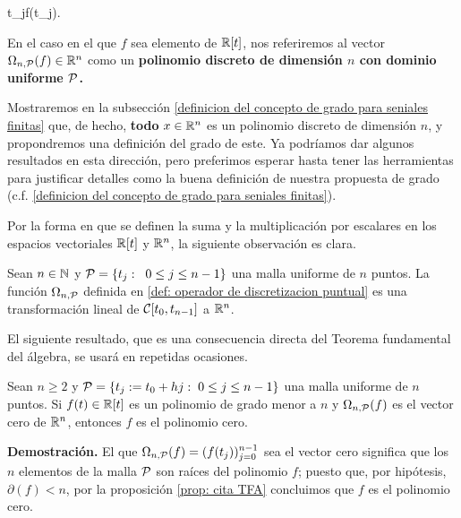 \begin{center}
{}
{\IR }
{t_{j}}{f(t_{j}).}
\end{center}



\begin{defi} \label{def: polinomio discreto}
En el caso en el que $f$ sea elemento de $\mathbb{R}[t]$, 
nos referiremos
al vector $\Omega_{n,\mathcal{P}}(f) \in \mathbb{R}^{n}$
como un \textbf{polinomio discreto de dimensión $n$ con dominio uniforme $\mathcal{P}$.} 
\end{defi} 



Mostraremos en la subsección
\ref{definicion del concepto de grado para seniales finitas}
que, de hecho, \textbf{todo}
$x \in \mathbb{R}^{n}$ es un polinomio discreto
de dimensión $n$,
y propondremos una definición del grado de este.
Ya podríamos dar algunos resultados en esta dirección,
pero preferimos esperar hasta tener las herramientas
para justificar detalles como la buena definición
de nuestra propuesta de grado (c.f. 
\ref{definicion del concepto de grado para seniales finitas}).


Por la forma en que se definen la suma y la multiplicación
por escalares en los espacios vectoriales $\mathbb{R}[t]$
y $\mathbb{R}^{n}$, la siguiente observación es clara.

\begin{obs} \label{obs:linealidad de omega restringida a R[x]}
Sean $n \in \mathbb{N}$ y $\mathcal{P}=\{t_{j}:
\hspace{0.2cm}0 \leq j \leq n-1 \}$ una malla uniforme
de $n$ puntos.
La función $\Omega_{n , \mathcal{P}}$ 
definida en 
\ref{def: operador de discretizacion puntual}
es una transformación lineal de 
$\mathcal{C}[t_{0}, t_{n-1}]$ a $\mathbb{R}^{n}$.
\end{obs}
 
El siguiente resultado, que es una consecuencia directa
del Teorema fundamental del álgebra, se usará en repetidas ocasiones.

\begin{prop}
\label{prop: consecuencia del TFA}
Sean $n \geq 2$ y 
$\mathcal{P}=\{ t_{j}:=t_{0}+hj : \hspace{0.1cm} 0 \leq j \leq n-1 \}$ 
una malla uniforme de $n$ puntos.
Si $f(t) \in \mathbb{R}[t]$ es un polinomio de grado menor a $n$ y
$\Omega_{n, \mathcal{P}}(f)$ es el vector cero de $\mathbb{R}^{n}$, entonces
$f$ es el polinomio cero.
\end{prop}
\noindent
\textbf{Demostración.}
El que $\Omega_{n, \mathcal{P}}(f)=(f(t_{j}))_{j=0}^{n-1}$ sea
el vector cero significa que los $n$ elementos de la malla
$\mathcal{P}$ son raíces del polinomio $f$; puesto que, por hipótesis,
$\partial(f) < n$, por la proposición
\ref{prop: cita TFA}
concluimos que
$f$ es el polinomio cero.
\QEDB
\vspace{0.2cm}




